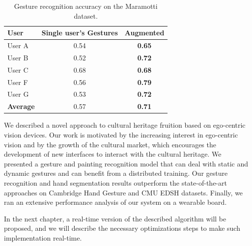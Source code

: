 \begin{table}[tb]
\renewcommand{\arraystretch}{1.3}
\caption{Gesture recognition accuracy on the Maramotti dataset.}
\label{gesture_comparison_maramotti}
\centering
\begin{tabular}{|l|c|c|}
\hline
\textbf{User}					& \textbf{Single user's Gestures} 	& \textbf{Augmented}  \\
\hline
\hline
User A						& 0.54 			& \textbf{0.65} \\		%
\hline
User B			 				& 0.52 			& \textbf{0.72} \\		%
\hline
User C			 			& 0.68 			& \textbf{0.68} \\		%
\hline
User F					 		& 0.56 			& \textbf{0.79} \\		%
\hline
User G						& 0.53 			& \textbf{0.72} \\		%
\hline
\textbf{Average}					& 0.57	  		& \textbf{0.71} \\
\hline
\end{tabular}
\end{table}

We described a novel approach to cultural heritage fruition based on ego-centric vision devices. Our work is motivated by the increasing interest in ego-centric vision and by the growth of the cultural market, which encourages the development of new interfaces to interact with the cultural heritage. We presented a gesture and painting recognition model that can deal with static and dynamic gestures and can benefit from a distributed training. Our gesture recognition and hand segmentation results outperform the state-of-the-art approaches on Cambridge Hand Gesture and CMU EDSH datasets. Finally, we ran an extensive performance analysis of our system on a wearable board. 

In the next chapter, a real-time version of the described algorithm will be proposed, and we will describe the necessary optimizations steps to make such implementation real-time.